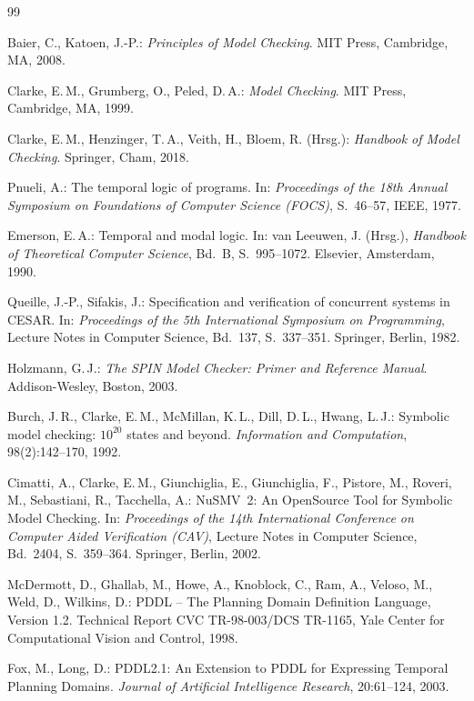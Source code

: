 ﻿\documentclass[a4paper,12pt]{article}
\theoremstyle{definition}
\begin{document}
\begin{thebibliography}{99}

Baier, C., Katoen, J.-P.:
\textit{Principles of Model Checking}.
MIT Press, Cambridge, MA, 2008.

Clarke, E.\,M., Grumberg, O., Peled, D.\,A.:
\textit{Model Checking}.
MIT Press, Cambridge, MA, 1999.

Clarke, E.\,M., Henzinger, T.\,A., Veith, H., Bloem, R. (Hrsg.):
\textit{Handbook of Model Checking}.
Springer, Cham, 2018.

Pnueli, A.:
The temporal logic of programs.
In: \textit{Proceedings of the 18th Annual Symposium on Foundations of Computer Science (FOCS)}, S.~46--57, IEEE, 1977.

Emerson, E.\,A.:
Temporal and modal logic.
In: van Leeuwen, J. (Hrsg.), \textit{Handbook of Theoretical Computer Science}, Bd.~B, S.~995--1072. Elsevier, Amsterdam, 1990.

Queille, J.-P., Sifakis, J.:
Specification and verification of concurrent systems in CESAR.
In: \textit{Proceedings of the 5th International Symposium on Programming}, Lecture Notes in Computer Science, Bd.~137, S.~337--351. Springer, Berlin, 1982.

Holzmann, G.\,J.:
\textit{The SPIN Model Checker: Primer and Reference Manual}.
Addison-Wesley, Boston, 2003.

Burch, J.\,R., Clarke, E.\,M., McMillan, K.\,L., Dill, D.\,L., Hwang, L.\,J.:
Symbolic model checking: $10^{20}$ states and beyond.
\textit{Information and Computation}, 98(2):142--170, 1992.

Cimatti, A., Clarke, E.\,M., Giunchiglia, E., Giunchiglia, F., Pistore, M., Roveri, M., Sebastiani, R., Tacchella, A.:
NuSMV~2: An OpenSource Tool for Symbolic Model Checking.
In: \textit{Proceedings of the 14th International Conference on Computer Aided Verification (CAV)}, Lecture Notes in Computer Science, Bd.~2404, S.~359--364. Springer, Berlin, 2002.

McDermott, D., Ghallab, M., Howe, A., Knoblock, C., Ram, A., Veloso, M., Weld, D., Wilkins, D.:
PDDL -- The Planning Domain Definition Language, Version 1.2.
Technical Report CVC TR-98-003/DCS TR-1165, Yale Center for Computational Vision and Control, 1998.

Fox, M., Long, D.:
PDDL2.1: An Extension to PDDL for Expressing Temporal Planning Domains.
\textit{Journal of Artificial Intelligence Research}, 20:61--124, 2003.


\end{thebibliography}
\end{document}
